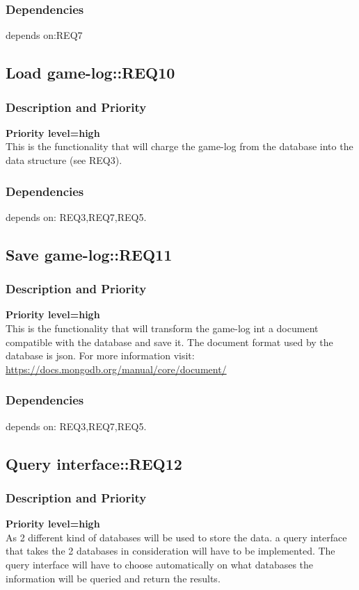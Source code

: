 \documentclass{scrreprt}
\begin{document}
\subsubsection{Dependencies}
depends on:REQ7

\subsection{Load game-log::REQ10}
\subsubsection{Description and Priority}
\textbf{Priority level=high}\\
This is the functionality that will charge the game-log from the database into
the data structure (see REQ3).
\subsubsection{Dependencies}
depends on: REQ3,REQ7,REQ5.


\subsection{Save game-log::REQ11}
\subsubsection{Description and Priority}
\textbf{Priority level=high}\\
This is the functionality that will transform the game-log int a document
compatible with the database and save it.
The document format used by the database is json.
For more information visit: \url{https://docs.mongodb.org/manual/core/document/}
\subsubsection{Dependencies}
depends on: REQ3,REQ7,REQ5.

\subsection{Query interface::REQ12}
\subsubsection{Description and Priority}
\textbf{Priority level=high}\\
As 2 different kind of databases will be used to store the data.
a query interface that takes the 2 databases in consideration will have to be
implemented.
The query interface will have to choose automatically on what databases the
information will be queried and return the results.
\end{document}
